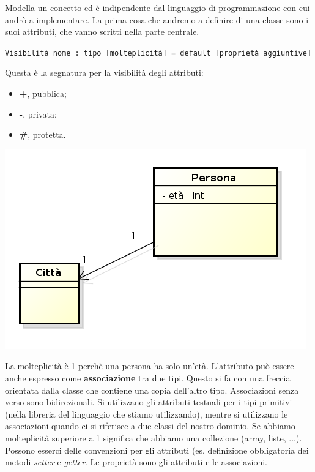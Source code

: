 Modella un concetto ed è indipendente dal linguaggio di programmazione con cui andrò a implementare. La prima cosa che andremo a definire di una classe sono i suoi attributi, che vanno scritti nella parte centrale.

\begin{center}

\texttt{Visibilità nome : tipo [molteplicità] = default [proprietà aggiuntive]}

\end{center}

Questa è la segnatura per la visibilità degli attributi:

\begin{itemize}

	\item \textbf{+}, pubblica;
	\item \textbf{-}, privata;
	\item \textbf{\#}, protetta.

\end{itemize}

\begin{center}

\includegraphics[width=0.75\columnwidth]{img7} %

\end{center}

La molteplicità è 1 perchè una persona ha solo un'età. L'attributo può essere anche espresso come \textbf{associazione} tra due tipi. Questo si fa con una freccia orientata dalla classe che contiene una copia dell'altro tipo. Associazioni senza verso sono bidirezionali. Si utilizzano gli attributi testuali per i tipi primitivi (nella libreria del linguaggio che stiamo utilizzando), mentre si utilizzano le associazioni quando ci si riferisce a due classi del nostro dominio. Se abbiamo molteplicità superiore a 1 significa che abbiamo una collezione (array, liste, ...). Possono esserci delle convenzioni per gli attributi (es. definizione obbligatoria dei metodi \textit{setter} e \textit{getter}. Le proprietà sono gli attributi e le associazioni.

